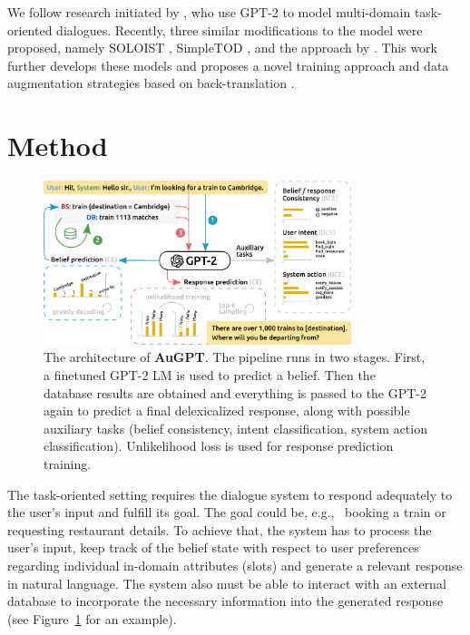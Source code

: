 \documentclass[letterpaper]{article} %
\begin{document}
We follow research initiated by \citet{budzianowski2019}, who use GPT-2 to model multi-domain task-oriented dialogues.  
Recently, three similar modifications to the model were proposed, namely SOLOIST \cite{peng2020}, SimpleTOD \cite{hosseini2020}, and the approach by \citet{ham2020}. 
This work further develops these models and proposes a novel training approach and data augmentation strategies based on back-translation \cite{edunov2018,federmann2019multilingual}.

\section{Method}
\begin{figure}[htbp]
\centering
\includegraphics[width=0.8\textwidth]{schema_v2} %
\caption{The architecture of \textbf{AuGPT}. The pipeline runs in two stages. First, a finetuned GPT-2 LM is used to predict a belief. Then the database results are obtained and everything is passed to the GPT-2 again to predict a final delexicalized response, along with possible auxiliary tasks (belief consistency, intent classification, system action classification). Unlikelihood loss is used for response prediction training.}
\label{fig:pipeline}
\end{figure}

The task-oriented setting requires the dialogue system to respond adequately to the user's input and fulfill its goal. The goal could be, e.g., \ booking a train or requesting restaurant details. To achieve that, the system has to process the user's input, keep track of the belief state with respect to user preferences regarding individual in-domain attributes (slots) and generate a relevant response in natural language. The system also must be able to interact with an external database to incorporate the necessary information into the generated response (see Figure~\ref{fig:pipeline} for an example).
\end{document}
